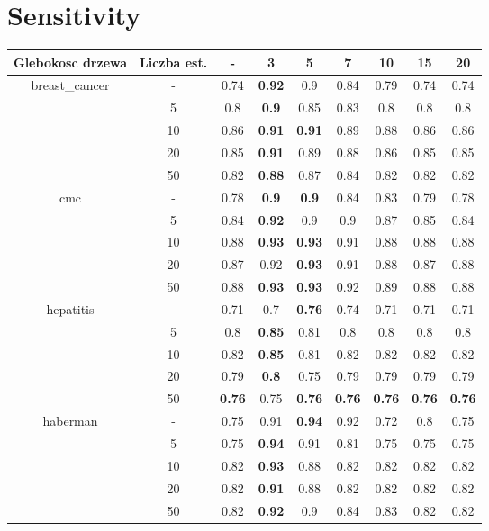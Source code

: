 \documentclass{article}%
\begin{document}
\section*{Sensitivity}%
\begin{tabular}{c|c|ccccccc}%
\hline%
Glebokosc drzewa&Liczba est.&{-}&3&5&7&10&15&20\\%
\hline%
\multirow{5}{*}{breast\_cancer}&{-}&0.74&\textbf{0.92}&0.9&0.84&0.79&0.74&0.74\\%
\cline{2%
-%
9}%
&5&0.8&\textbf{0.9}&0.85&0.83&0.8&0.8&0.8\\%
\cline{2%
-%
9}%
&10&0.86&\textbf{0.91}&\textbf{0.91}&0.89&0.88&0.86&0.86\\%
\cline{2%
-%
9}%
&20&0.85&\textbf{0.91}&0.89&0.88&0.86&0.85&0.85\\%
\cline{2%
-%
9}%
&50&0.82&\textbf{0.88}&0.87&0.84&0.82&0.82&0.82\\%
\hline%
\multirow{5}{*}{cmc}&{-}&0.78&\textbf{0.9}&\textbf{0.9}&0.84&0.83&0.79&0.78\\%
\cline{2%
-%
9}%
&5&0.84&\textbf{0.92}&0.9&0.9&0.87&0.85&0.84\\%
\cline{2%
-%
9}%
&10&0.88&\textbf{0.93}&\textbf{0.93}&0.91&0.88&0.88&0.88\\%
\cline{2%
-%
9}%
&20&0.87&0.92&\textbf{0.93}&0.91&0.88&0.87&0.88\\%
\cline{2%
-%
9}%
&50&0.88&\textbf{0.93}&\textbf{0.93}&0.92&0.89&0.88&0.88\\%
\hline%
\multirow{5}{*}{hepatitis}&{-}&0.71&0.7&\textbf{0.76}&0.74&0.71&0.71&0.71\\%
\cline{2%
-%
9}%
&5&0.8&\textbf{0.85}&0.81&0.8&0.8&0.8&0.8\\%
\cline{2%
-%
9}%
&10&0.82&\textbf{0.85}&0.81&0.82&0.82&0.82&0.82\\%
\cline{2%
-%
9}%
&20&0.79&\textbf{0.8}&0.75&0.79&0.79&0.79&0.79\\%
\cline{2%
-%
9}%
&50&\textbf{0.76}&0.75&\textbf{0.76}&\textbf{0.76}&\textbf{0.76}&\textbf{0.76}&\textbf{0.76}\\%
\hline%
\multirow{5}{*}{haberman}&{-}&0.75&0.91&\textbf{0.94}&0.92&0.72&0.8&0.75\\%
\cline{2%
-%
9}%
&5&0.75&\textbf{0.94}&0.91&0.81&0.75&0.75&0.75\\%
\cline{2%
-%
9}%
&10&0.82&\textbf{0.93}&0.88&0.82&0.82&0.82&0.82\\%
\cline{2%
-%
9}%
&20&0.82&\textbf{0.91}&0.88&0.82&0.82&0.82&0.82\\%
\cline{2%
-%
9}%
&50&0.82&\textbf{0.92}&0.9&0.84&0.83&0.82&0.82\\%

\end{tabular}
\end{document}
